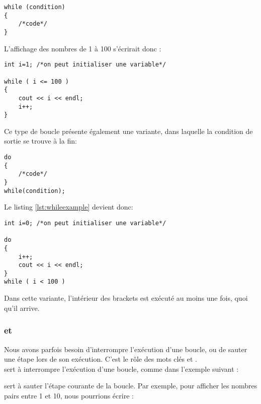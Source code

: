\begin{DDbox}{\linewidth}
\begin{lstlisting}
while (condition)
{
    /*code*/
}
\end{lstlisting}
\end{DDbox}

L'affichage des nombres de 1 \`a 100 s'\'ecrirait donc :\\

\begin{DDbox}{\linewidth}
\begin{lstlisting}[label=lst:whileexample]
int i=1; /*on peut initialiser une variable*/

while ( i <= 100 )
{
    cout << i << endl;
    i++;
}
\end{lstlisting}
\end{DDbox}

Ce type de boucle pr\'esente \'egalement une variante, dans laquelle la condition de sortie se trouve \`a la fin:\\

\begin{DDbox}{\linewidth}
\begin{lstlisting}
do
{
	/*code*/
}
while(condition);
\end{lstlisting}
\end{DDbox}

Le listing \ref{lst:whileexample} devient donc:\\

\begin{DDbox}{\linewidth}
\begin{lstlisting}
int i=0; /*on peut initialiser une variable*/

do
{
    i++;
    cout << i << endl;
}
while ( i < 100 )
\end{lstlisting}
\end{DDbox}

Dans cette variante, l'int\'erieur des brackets est ex\'ecut\'e au moins une fois, quoi qu'il arrive.\\

\subsubsection{ et }
Nous avons parfois besoin d'interrompre l'ex\'ecution d'une boucle, ou de sauter une \'etape lors de son ex\'ecution. C'est le r\^ole des mots cl\'es  et .\\

 sert \`a interrompre l'ex\'ecution d'une boucle, comme dans l'exemple suivant :\\

%

 sert \`a sauter l'\'etape courante de la boucle. Par exemple, pour afficher les nombres pairs entre 1 et 10, nous pourrions \'ecrire :\\

%
